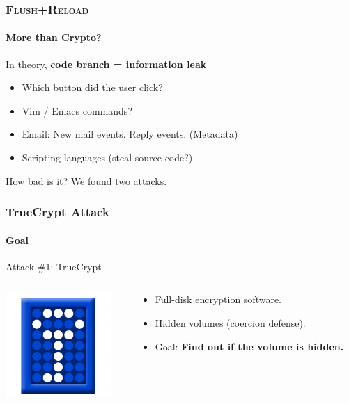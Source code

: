 \documentclass{beamer}
\begin{document}
\begin{frame}
    \frametitle{\textsc{Flush+Reload}}
    \framesubtitle{More than Crypto?}

    In theory, \textbf{code branch = information leak}

    \begin{itemize}
        \item Which button did the user click?
        \item Vim / Emacs commands?
        \item Email: New mail events. Reply events. (Metadata)
        \item Scripting languages (steal source code?)
    \end{itemize}

    How bad is it? We found two attacks.
\end{frame}


\begin{frame}
    \frametitle{TrueCrypt Attack}
    \framesubtitle{Goal}

    \begin{center}
    {\Large Attack \#1: TrueCrypt}
    \end{center}
    \begin{columns}
        \begin{column}{0.3\textwidth}
            \includegraphics[width=4cm,keepaspectratio]{tclogo.png}
        \end{column}
        \begin{column}{0.7\textwidth}
        \begin{itemize}
            \item Full-disk encryption software.
            \item Hidden volumes (coercion defense).
            \item Goal: \textbf{Find out if the volume is hidden.}
        \end{itemize}
        \end{column}
    \end{columns}

\end{frame}
\end{document}
